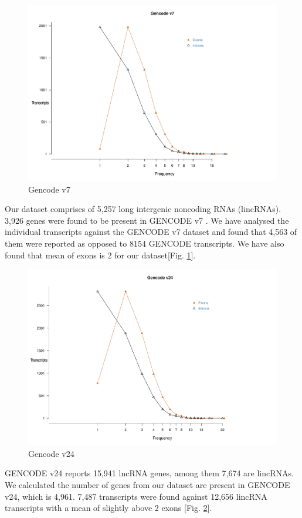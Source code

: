 \documentclass[ncrna,article,submit,moreauthors,pdftex,10pt,a4paper]{mdpi}
\begin{document}
 \begin{figure}[h]
  \centering
  \includegraphics[width=\linewidth]{Gencode_v7_replot.pdf}
  \caption{Gencode v7}
  \label{f1}
 \end{figure}

Our dataset comprises of 5,257 long intergenic noncoding RNAs (lincRNAs). 3,926 genes were found to be present in GENCODE v7 \cite{harrow2012}. We have analysed the individual transcripts against the GENCODE v7 dataset and found that 4,563 of them were reported as opposed to 8154 GENCODE transcripts. We have also found that mean of exons is 2 for our dataset[Fig. \ref{f1}].
\clearpage
 \begin{figure}[h]
  \centering
  \includegraphics[width=\linewidth]{Gencode_v24_replot.pdf}
  \caption{Gencode v24}
  \label{f2} 
 \end{figure}
 
GENCODE v24 reports 15,941 lncRNA genes, among them 7,674 are lincRNAs. We calculated the number of genes from our dataset are present in GENCODE v24, which is 4,961. 7,487 transcripts were found against 12,656 lincRNA transcripts with a mean of slightly above 2 exons [Fig. \ref{f2}].



\end{document}
